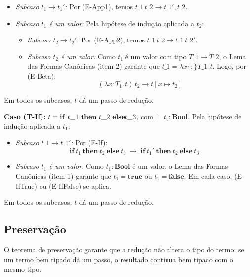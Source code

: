 \begin{itemize}
  \item
    \emph{Subcaso \(t_1 \to t_1'\):} Por (E-App1), temos
    \(t\_1\, t\_2 \to t\_1', t\_2\).
  \item
    \emph{Subcaso \(t_1\) é um valor:} Pela hipótese de indução
    aplicada a \(t_2\):

    \begin{itemize}
      \item
        \emph{Subcaso \(t_2 \to t_2'\):} Por (E-App2), temos
        \(t\_1\, t\_2 \to
        t\_1\, t\_2'\).
      \item
        \emph{Subcaso \(t_2\) é um valor:} Como \(t_1\) é um valor
        com tipo \(T\_1 \to T\_2\), o Lema
        das Formas Canônicas (item 2) garante que \(t\_1
        = \lambda x \{:\} T\_1.\, t\).
        Logo, por (E-Beta): \[ (\lambda x {:} T_1.\,
        t)\, t_2 \to t[x \mapsto t_2] \]
    \end{itemize}
\end{itemize}

Em todos os subcasos, \(t\) dá um passo de redução.

\textbf{Caso (T-If):} \(t =
  \mathbf{if}~t\_1~\mathbf{then}~t\_2~\mathbf{else}\\
t\_3\), com \(\vdash t_1 : \mathbf{Bool}\). Pela
hipótese de indução aplicada a \(t_1\):

\begin{itemize}
  \item
    \emph{Subcaso \(t\_1 \to t\_1'\):} Por
    (E-If): \[ \mathbf{if}\ t_1\ \mathbf{then}\
      t_2\ \mathbf{else}\ t_3 \;\to\; \mathbf{if}\ t_1'\ \mathbf{then}\ t_2\
    \mathbf{else}\ t_3 \]
  \item
    \emph{Subcaso \(t_1\) é um valor:} Como \(t_1 : \mathbf{Bool}\) é
    um valor, o Lema das Formas Canônicas (item 1) garante que \(t_1
    = \mathbf{true}\) ou \(t_1 = \mathbf{false}\). Em cada caso,
    (E-IfTrue) ou (E-IfFalse) se aplica.
\end{itemize}

Em todos os subcasos, \(t\) dá um passo de redução.

\subsection{Preservação}

O teorema de preservação garante que a redução não altera o tipo do
termo: se um termo bem tipado dá um passo, o resultado continua bem
tipado com o mesmo tipo.

